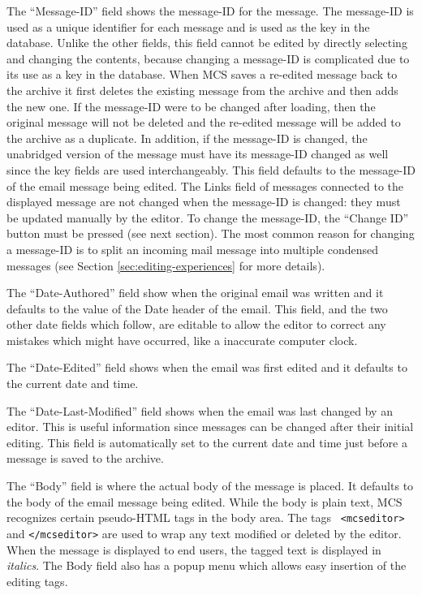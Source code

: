 The ``Message-ID'' field shows the message-ID for the message. The message-ID
is used as a unique identifier for each message and is used as the key in the
database. Unlike the other fields, this field cannot be edited by directly
selecting and changing the contents, because changing a message-ID is
complicated due to its use as a key in the database. When MCS saves a re-edited
message back to the archive it first deletes the existing message from the
archive and then adds the new one. If the message-ID were to be changed after
loading, then the original message will not be deleted and the re-edited
message will be added to the archive as a duplicate. In addition, if the
message-ID is changed, the unabridged version of the message must have its
message-ID changed as well since the key fields are used interchangeably. This
field defaults to the message-ID of the email message being edited. The Links
field of messages connected to the displayed message are not changed when the
message-ID is changed: they must be updated manually by the editor. To change
the message-ID, the ``Change ID'' button must be pressed (see next section).
The most common reason for changing a message-ID is to split an incoming mail
message into multiple condensed messages (see Section
\ref{sec:editing-experiences} for more details).

The ``Date-Authored'' field show when the original email was written and it
defaults to the value of the Date header of the email. This field, and the two
other date fields which follow, are editable to allow the editor to correct any
mistakes which might have occurred, like a inaccurate computer clock.

The ``Date-Edited'' field shows when the email was first edited and it defaults
to the current date and time.

The ``Date-Last-Modified'' field shows when the email was last changed by an
editor. This is useful information since messages can be changed after their
initial editing. This field is automatically set to the current date and time
just before a message is saved to the archive.

The ``Body'' field is where the actual body of the message is placed. It
defaults to the body of the email message being edited. While the body is plain
text, MCS recognizes certain pseudo-HTML tags in the body area. The tags {\tt
<mcseditor>} and {\tt </mcseditor>} are used to wrap any text modified or
deleted by the editor. When the message is displayed to end users, the tagged
text is displayed in {\em italics}. The Body field also has a popup menu which
allows easy insertion of the editing tags.

